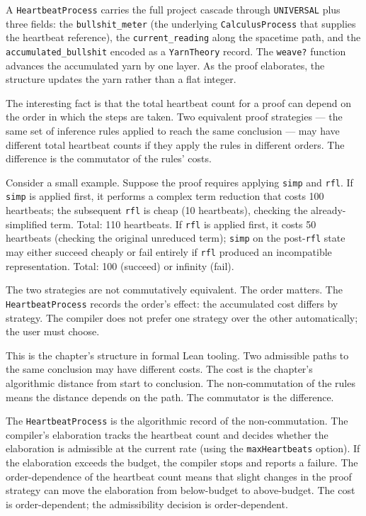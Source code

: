A \texttt{HeartbeatProcess} carries the full project cascade
through \texttt{UNIVERSAL} plus three fields: the
\texttt{bullshit\_meter} (the underlying \texttt{CalculusProcess}
that supplies the heartbeat reference), the
\texttt{current\_reading} along the spacetime path, and the
\texttt{accumulated\_bullshit} encoded as a \texttt{YarnTheory}
record. The \texttt{weave?} function advances the accumulated
yarn by one layer. As the proof elaborates, the structure updates
the yarn rather than a flat integer.

The interesting fact is that the total heartbeat count for a proof
can depend on the order in which the steps are taken. Two equivalent
proof strategies --- the same set of inference rules applied to reach
the same conclusion --- may have different total heartbeat counts if
they apply the rules in different orders. The difference is the
commutator of the rules' costs.

Consider a small example. Suppose the proof requires applying
\texttt{simp} and \texttt{rfl}. If \texttt{simp} is applied first, it
performs a complex term reduction that costs 100 heartbeats; the
subsequent \texttt{rfl} is cheap (10 heartbeats), checking the
already-simplified term. Total: 110 heartbeats. If \texttt{rfl} is
applied first, it costs 50 heartbeats (checking the original
unreduced term); \texttt{simp} on the post-\texttt{rfl} state may
either succeed cheaply or fail entirely if \texttt{rfl} produced an
incompatible representation. Total: 100 (succeed) or infinity (fail).

The two strategies are not commutatively equivalent. The order
matters. The \texttt{HeartbeatProcess} records the order's effect:
the accumulated cost differs by strategy. The compiler does not
prefer one strategy over the other automatically; the user must
choose.

This is the chapter's structure in formal Lean tooling. Two
admissible paths to the same conclusion may have different costs.
The cost is the chapter's algorithmic distance from start to
conclusion. The non-commutation of the rules means the distance
depends on the path. The commutator is the difference.

The \texttt{HeartbeatProcess} is the algorithmic record of the
non-commutation. The compiler's elaboration tracks the heartbeat
count and decides whether the elaboration is admissible at the
current rate (using the \texttt{maxHeartbeats} option). If the
elaboration exceeds the budget, the compiler stops and reports a
failure. The order-dependence of the heartbeat count means that
slight changes in the proof strategy can move the elaboration
from below-budget to above-budget. The cost is order-dependent;
the admissibility decision is order-dependent.

